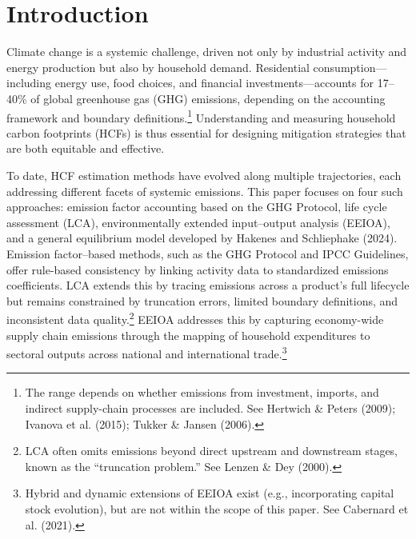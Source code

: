 \documentclass[12pt,a4paper]{article}%
\begin{document}
\vspace{0.3cm}




\section{Introduction}

Climate change is a systemic challenge, driven not only by industrial activity and energy production but also by household demand. Residential consumption—including energy use, food choices, and financial investments—accounts for 17--40\% of global greenhouse gas (GHG) emissions, depending on the accounting framework and boundary definitions.\footnote{The range depends on whether emissions from investment, imports, and indirect supply-chain processes are included. See Hertwich \& Peters (2009); Ivanova et al. (2015); Tukker \& Jansen (2006).} Understanding and measuring household carbon footprints (HCFs) is thus essential for designing mitigation strategies that are both equitable and effective.

To date, HCF estimation methods have evolved along multiple trajectories, each addressing different facets of systemic emissions. This paper focuses on four such approaches: emission factor accounting based on the GHG Protocol, life cycle assessment (LCA), environmentally extended input--output analysis (EEIOA), and a general equilibrium model developed by Hakenes and Schliephake (2024). Emission factor--based methods, such as the GHG Protocol and IPCC Guidelines, offer rule-based consistency by linking activity data to standardized emissions coefficients. LCA extends this by tracing emissions across a product’s full lifecycle but remains constrained by truncation errors, limited boundary definitions, and inconsistent data quality.\footnote{LCA often omits emissions beyond direct upstream and downstream stages, known as the ``truncation problem.'' See Lenzen \& Dey (2000).} EEIOA addresses this by capturing economy-wide supply chain emissions through the mapping of household expenditures to sectoral outputs across national and international trade.\footnote{Hybrid and dynamic extensions of EEIOA exist (e.g., incorporating capital stock evolution), but are not within the scope of this paper. See Cabernard et al. (2021).}
\end{document}
